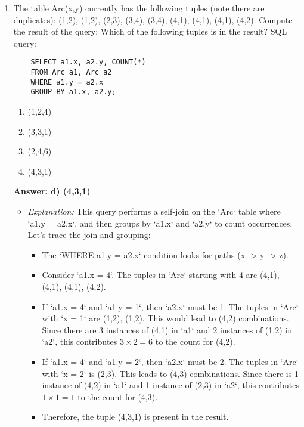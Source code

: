 \documentclass{article}
\begin{document}
\begin{enumerate}[label=\textbf{Question \arabic*.}]
\item The table Arc(x,y) currently has the following tuples (note there are duplicates): (1,2), (1,2), (2,3), (3,4), (3,4), (4,1), (4,1), (4,1), (4,2). Compute the result of the query: Which of the following tuples is in the result?
    SQL query:
    \begin{verbatim}
    SELECT a1.x, a2.y, COUNT(*)
    FROM Arc a1, Arc a2
    WHERE a1.y = a2.x
    GROUP BY a1.x, a2.y;
    \end{verbatim}
    \begin{enumerate}[label=\alph*)]
        \item (1,2,4)
        \item (3,3,1)
        \item (2,4,6)
        \item (4,3,1)
    \end{enumerate}
    \textbf{Answer: d) (4,3,1)}
    \begin{itemize}
        \item \textit{Explanation:} This query performs a self-join on the `Arc` table where `a1.y = a2.x`, and then groups by `a1.x` and `a2.y` to count occurrences. Let's trace the join and grouping:
        \begin{itemize}
            \item The `WHERE a1.y = a2.x` condition looks for paths (x -> y -> z).
            \item Consider `a1.x = 4`. The tuples in `Arc` starting with 4 are (4,1), (4,1), (4,1), (4,2).
            \item If `a1.x = 4` and `a1.y = 1`, then `a2.x` must be 1. The tuples in `Arc` with `x = 1` are (1,2), (1,2). This would lead to (4,2) combinations. Since there are 3 instances of (4,1) in `a1` and 2 instances of (1,2) in `a2`, this contributes $3 \times 2 = 6$ to the count for (4,2).
            \item If `a1.x = 4` and `a1.y = 2`, then `a2.x` must be 2. The tuples in `Arc` with `x = 2` is (2,3). This leads to (4,3) combinations. Since there is 1 instance of (4,2) in `a1` and 1 instance of (2,3) in `a2`, this contributes $1 \times 1 = 1$ to the count for (4,3).
            \item Therefore, the tuple (4,3,1) is present in the result.
        \end{itemize}
    \end{itemize}


\end{enumerate}
\end{document}
